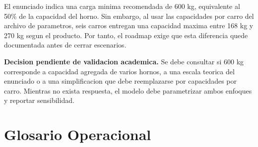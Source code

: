 \documentclass[12pt]{article}
\newcommand{\alerta}[1]{\textcolor{rojoriesgo}{\textbf{#1}}}
\begin{document}
El enunciado indica una carga minima recomendada de 600 kg, equivalente al 50\% de la capacidad del horno. Sin embargo, al usar las capacidades por carro del archivo de parametros, seis carros entregan una capacidad maxima entre 168 kg y 270 kg segun el producto. Por tanto, el roadmap exige que esta diferencia quede documentada antes de cerrar escenarios.

\begin{center}
\colorbox{rojoriesgo!8}{%
\parbox{0.92\textwidth}{%
\alerta{Decision pendiente de validacion academica.} Se debe consultar si 600 kg corresponde a capacidad agregada de varios hornos, a una escala teorica del enunciado o a una simplificacion que debe reemplazarse por capacidades por carro. Mientras no exista respuesta, el modelo debe parametrizar ambos enfoques y reportar sensibilidad.
}}
\end{center}

\section{Glosario Operacional}
\end{document}
